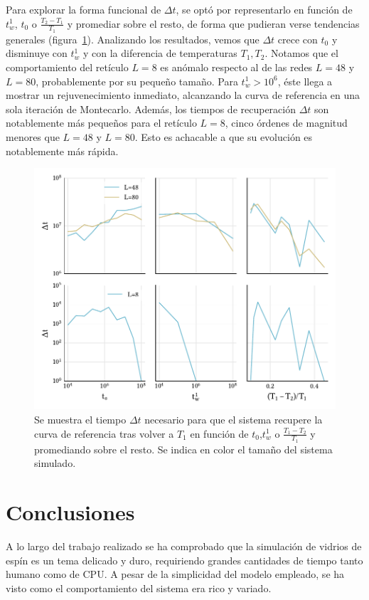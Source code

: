 \documentclass[11pt]{report}
\begin{document}
Para explorar la forma funcional de $Δt$, se optó por representarlo en
función de $t_w^1$, $t_0$ o $\frac{T_2-T_1}{T_1}$
y promediar sobre el resto, de forma que pudieran verse tendencias
generales (figura~\ref{fig:memdep}). Analizando los resultados, vemos
que $Δt$ crece con $t_0$ y disminuye con $t_w^1$ y con la diferencia
de temperaturas $T_1, T_2$. Notamos que el comportamiento del retículo
$L=8$ es anómalo respecto al de las redes $L=48$ y $L=80$,
probablemente por su pequeño tamaño. Para $t_w^1 > 10^6$, éste llega a
mostrar un rejuvenecimiento inmediato, alcanzando la curva de
referencia en una sola iteración de Montecarlo. Además, los tiempos de
recuperación $Δt$ son notablemente más pequeños para el retículo
$L=8$, cinco órdenes de magnitud menores que $L=48$ y $L=80$. Esto es
achacable a que su evolución es notablemente más rápida.

\begin{figure}
  \centering
  \includegraphics{../study_cases/memory/dependences.pdf}
  \caption{Se muestra el tiempo $Δt$ necesario para que el sistema
    recupere la curva de referencia tras volver a $T_1$ en función de
    $t_0$,$t_w^1$ o $\frac{T_1-T_2}{T_1}$ y promediando sobre el
    resto. Se indica en color el tamaño del sistema simulado.}
  \label{fig:memdep}
\end{figure}



\chapter{Conclusiones}
A lo largo del trabajo realizado se ha comprobado que la simulación de
vidrios de espín es un tema delicado y duro, requiriendo grandes
cantidades de tiempo tanto humano como de CPU. A pesar de la
simplicidad del modelo empleado, se ha visto como el comportamiento
del sistema era rico y variado.
\end{document}
